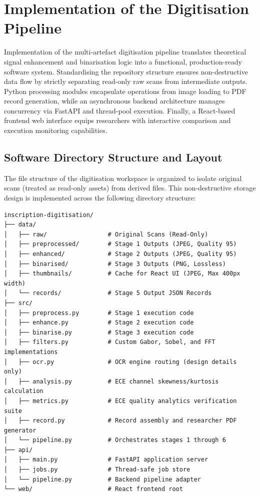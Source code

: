 \chapter{Implementation of the Digitisation Pipeline}

Implementation of the multi-artefact digitisation pipeline translates theoretical signal enhancement and binarisation logic into a functional, production-ready software system. Standardising the repository structure ensures non-destructive data flow by strictly separating read-only raw scans from intermediate outputs. Python processing modules encapsulate operations from image loading to PDF record generation, while an asynchronous backend architecture manages concurrency via FastAPI and thread-pool execution. Finally, a React-based frontend web interface equips researchers with interactive comparison and execution monitoring capabilities.

\section{Software Directory Structure and Layout}

The file structure of the digitisation workspace is organized to isolate original scans (treated as read-only assets) from derived files. This non-destructive storage design is implemented across the following directory structure:

\begin{tcolorbox}[colback=blue!5, colframe=blue!40, title=Project Directory Layout, fonttitle=\bfseries]
\begin{verbatim}
inscription-digitisation/
├── data/
│   ├── raw/                 # Original Scans (Read-Only)
│   ├── preprocessed/        # Stage 1 Outputs (JPEG, Quality 95)
│   ├── enhanced/            # Stage 2 Outputs (JPEG, Quality 95)
│   ├── binarised/           # Stage 3 Outputs (PNG, Lossless)
│   ├── thumbnails/          # Cache for React UI (JPEG, Max 400px width)
│   └── records/             # Stage 5 Output JSON Records
├── src/
│   ├── preprocess.py        # Stage 1 execution code
│   ├── enhance.py           # Stage 2 execution code
│   ├── binarise.py          # Stage 3 execution code
│   ├── filters.py           # Custom Gabor, Sobel, and FFT implementations
│   ├── ocr.py               # OCR engine routing (design details only)
│   ├── analysis.py          # ECE channel skewness/kurtosis calculation
│   ├── metrics.py           # ECE quality analytics verification suite
│   ├── record.py            # Record assembly and researcher PDF generator
│   └── pipeline.py          # Orchestrates stages 1 through 6
├── api/
│   ├── main.py              # FastAPI application server
│   ├── jobs.py              # Thread-safe job store
│   └── pipeline.py          # Backend pipeline adapter
└── web/                     # React frontend root
\end{verbatim}
\end{tcolorbox}

